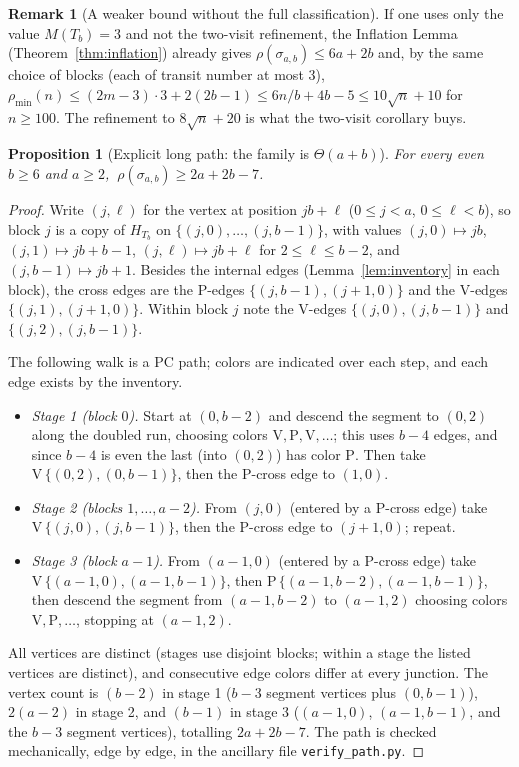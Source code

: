 \documentclass[11pt]{article}
\newtheorem{proposition}[theorem]{Proposition}
\theoremstyle{definition}
\newtheorem{remark}[theorem]{Remark}
\newcommand{\pmin}{\rho_{\min}}
\begin{document}
\begin{remark}[A weaker bound without the full classification]\label{rem:crude}
If one uses only the value $M(T_b) = 3$ and not the two-visit refinement, the Inflation
Lemma (Theorem~\ref{thm:inflation}) already gives $\rho(\sigma_{a,b}) \le 6a + 2b$ and,
by the same choice of blocks (each of transit number at most $3$),
$\pmin(n) \le (2m-3)\cdot 3 + 2(2b-1) \le 6n/b + 4b - 5 \le 10\sqrt n + 10$ for
$n \ge 100$. The refinement to $8\sqrt n + 20$ is what the two-visit corollary buys.
\end{remark}

\begin{proposition}[Explicit long path: the family is $\Theta(a+b)$]\label{prop:lower}
For every even $b \ge 6$ and $a \ge 2$, $\ \rho(\sigma_{a,b}) \ge 2a + 2b - 7$.
\end{proposition}

\begin{proof}
Write $(j, \ell)$ for the vertex at position $jb + \ell$ ($0 \le j < a$,
$0 \le \ell < b$), so block $j$ is a copy of $H_{T_b}$ on $\{(j,0), \dots, (j,b-1)\}$,
with values $(j,0) \mapsto jb$, $(j,1) \mapsto jb + b - 1$, $(j,\ell) \mapsto jb + \ell$
for $2 \le \ell \le b-2$, and $(j, b-1) \mapsto jb + 1$. Besides the internal edges
(Lemma~\ref{lem:inventory} in each block), the cross edges are the P-edges
$\{(j, b-1), (j+1, 0)\}$ and the V-edges $\{(j, 1), (j+1, 0)\}$. Within block $j$ note
the V-edges $\{(j,0), (j,b-1)\}$ and $\{(j,2), (j,b-1)\}$.

The following walk is a PC path; colors are indicated over each step, and each edge
exists by the inventory.
\begin{itemize}
\item \emph{Stage 1 (block $0$).} Start at $(0, b-2)$ and descend the segment to
$(0, 2)$ along the doubled run, choosing colors $\mathrm V, \mathrm P, \mathrm V, \dots$;
this uses $b - 4$ edges, and since $b - 4$ is even the last (into $(0,2)$) has color
$\mathrm P$. Then take $\mathrm V\,\{(0,2), (0,b-1)\}$, then the P-cross edge to
$(1, 0)$.
\item \emph{Stage 2 (blocks $1, \dots, a-2$).} From $(j, 0)$ (entered by a P-cross
edge) take $\mathrm V\,\{(j,0), (j,b-1)\}$, then the P-cross edge to $(j+1, 0)$; repeat.
\item \emph{Stage 3 (block $a-1$).} From $(a-1, 0)$ (entered by a P-cross edge) take
$\mathrm V\,\{(a-1,0), (a-1,b-1)\}$, then $\mathrm P\,\{(a-1,b-2), (a-1,b-1)\}$, then
descend the segment from $(a-1, b-2)$ to $(a-1, 2)$ choosing colors
$\mathrm V, \mathrm P, \dots$, stopping at $(a-1, 2)$.
\end{itemize}
All vertices are distinct (stages use disjoint blocks; within a stage the listed
vertices are distinct), and consecutive edge colors differ at every junction. The vertex
count is $(b - 2)$ in stage 1 ($b-3$ segment vertices plus $(0, b-1)$), $2(a-2)$ in
stage 2, and $(b - 1)$ in stage 3 ($(a-1,0)$, $(a-1,b-1)$, and the $b-3$ segment
vertices), totalling $2a + 2b - 7$. The path is checked mechanically, edge by edge, in
the ancillary file \texttt{verify\_path.py}.
\end{proof}
\end{document}
